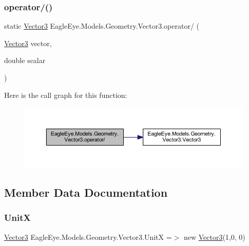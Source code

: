 \subsubsection{\texorpdfstring{operator/()}{operator/()}}
{\footnotesize\ttfamily static \mbox{\hyperlink{struct_eagle_eye_1_1_models_1_1_geometry_1_1_vector3}{Vector3}} Eagle\+Eye.\+Models.\+Geometry.\+Vector3.\+operator/ (\begin{DoxyParamCaption}\item[{\mbox{\hyperlink{struct_eagle_eye_1_1_models_1_1_geometry_1_1_vector3}{Vector3}}}]{vector,  }\item[{double}]{scalar }\end{DoxyParamCaption})\hspace{0.3cm}{\ttfamily [static]}}

Here is the call graph for this function\+:\nopagebreak
\begin{figure}[H]
\begin{center}
\leavevmode
\includegraphics[width=350pt]{struct_eagle_eye_1_1_models_1_1_geometry_1_1_vector3_a9b7fedd733eb64cd5767e25210de0d38_cgraph}
\end{center}
\end{figure}


\subsection{Member Data Documentation}
\mbox{\label{struct_eagle_eye_1_1_models_1_1_geometry_1_1_vector3_ada038e2f8c28fe2f27777c90d8c603d3}} 
\subsubsection{\texorpdfstring{UnitX}{UnitX}}
{\footnotesize\ttfamily \mbox{\hyperlink{struct_eagle_eye_1_1_models_1_1_geometry_1_1_vector3}{Vector3}} Eagle\+Eye.\+Models.\+Geometry.\+Vector3.\+UnitX =$>$ new \mbox{\hyperlink{struct_eagle_eye_1_1_models_1_1_geometry_1_1_vector3}{Vector3}}(1,0, 0)\hspace{0.3cm}{\ttfamily [static]}}


